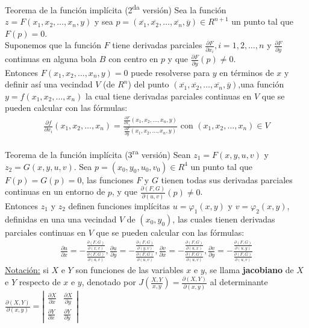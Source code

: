 \documentclass[a4paper, twoside]{article}
\numberwithin{equation}{section}
\numberwithin{figure}{section}
\numberwithin{table}{section}
\begin{document}
\begin{teorema*}{Teorema de la función implícita (2\textsuperscript{da} versión)}
	Sea la función $z=F(x_1,x_2,\ldots,x_n,y)$ y sea $p=(\overline{x_1},\overline{x_2},\ldots,\overline{x_n},\overline{y}) \in R^{n+1}$ un punto tal que $F\left(p\right)=0$.\\
	
	Suponemos que la función $F$ tiene derivadas parciales $\frac{\partial F}{\partial x_i},i=1,2,\ldots,n$ y $\frac{\partial F}{\partial y}$ continuas en alguna bola $B$ con centro en $p$ y que $\frac{\partial F}{\partial y}(p)\ne0$.\\
	
	Entonces $F(x_1,x_2,\ldots,x_n,y)=0$ puede resolverse para $y$ en términos de $x$ y definir así una vecindad $V$ (de $R^n$) del punto $(\overline{x_1},\overline{x_2},\ldots,\overline{x_n},\overline{y})$,una función $y=f(x_1,x_2,\ldots,x_n)$ la cual tiene derivadas parciales continuas en $V$ que se pueden calcular con las fórmulas:
	\begin{align}
		\frac{\partial f}{\partial x_i}(x_1,x_2,\ldots,x_n)=\frac{\frac{\partial F}{\partial x_i}(x_1,x_2,\ldots,x_n,y)}{\frac{\partial F}{\partial y}(x_1,x_2,\ldots,x_n,y)} \text{ con } (x_1,x_2,\ldots,x_n) \in V
	\end{align}
\end{teorema*}

\begin{teorema*}{Teorema de la función implícita (3\textsuperscript{ra} versión)}
	Sean $z_1=F(x,y,u,v)$ y $z_2=G(x,y,u,v)$. Sea $p=(x_0,y_0,u_0,v_0) \in R^4$ un punto tal que $F(p)=G(p)=0$, las funciones $F$ y $G$ tienen todas sus derivadas parciales continuas en un entorno de $p$, y que $\frac{\partial(F,G)}{\partial(u,v)}(p)\ne0$.\\
	
	Entonces $z_1$ y $z_2$ definen funciones implícitas $u=\varphi_1(x,y)$ y $v=\varphi_2(x,y)$, definidas en una una vecindad $V$ de $(x_0,y_0)$, las cuales tienen derivadas parciales continuas en $V$ que se pueden calcular con las fórmulas:
	\begin{align}
		\frac{\partial u}{\partial x}=-\frac{\frac{\partial(F,G)}{\partial(x,v)}}{\frac{\partial(F,G)}{\partial(u,v)}},\frac{\partial u}{\partial y}=-\frac{\frac{\partial(F,G)}{\partial(y,v)}}{\frac{\partial(F,G)}{\partial(u,v)}},\frac{\partial v}{\partial x}=-\frac{\frac{\partial(F,G)}{\partial(u,x)}}{\frac{\partial(F,G)}{\partial(u,v)}},\frac{\partial v}{\partial y}=-\frac{\frac{\partial(F,G)}{\partial(u,y)}}{\frac{\partial(F,G)}{\partial(u,v)}}
	\end{align}
	\underline{Notación:} si $X$ e $Y$ son funciones de las variables $x$ e $y$, se llama \textbf{jacobiano} de $X$ e $Y$ respecto de $x$ e $y$, denotado por $J\left(\frac{X,Y}{x,y}\right)=\frac{\partial\left(X,Y\right)}{\partial\left(x,y\right)}$ al determinante $\frac{\partial\left(X,Y\right)}{\partial\left(x,y\right)}=\left|\begin{array}{cc}\frac{\partial X}{\partial x} & \frac{\partial X}{\partial y}\\
	\frac{\partial Y}{\partial x} & \frac{\partial Y}{\partial y}\end{array}\right|$
\end{teorema*}
\end{document}
